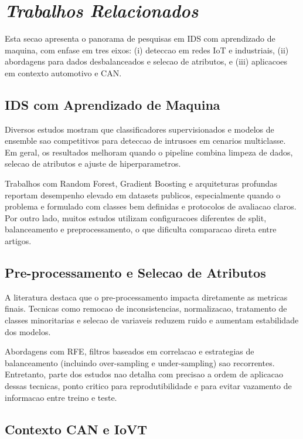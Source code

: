 \chapter{\textit{Trabalhos Relacionados}}

Esta secao apresenta o panorama de pesquisas em IDS com aprendizado de maquina, com enfase em tres eixos: (i) deteccao em redes IoT e industriais, (ii) abordagens para dados desbalanceados e selecao de atributos, e (iii) aplicacoes em contexto automotivo e CAN.

\section{IDS com Aprendizado de Maquina}

Diversos estudos mostram que classificadores supervisionados e modelos de ensemble sao competitivos para deteccao de intrusoes em cenarios multiclasse. Em geral, os resultados melhoram quando o pipeline combina limpeza de dados, selecao de atributos e ajuste de hiperparametros.

Trabalhos com Random Forest, Gradient Boosting e arquiteturas profundas reportam desempenho elevado em datasets publicos, especialmente quando o problema e formulado com classes bem definidas e protocolos de avaliacao claros. Por outro lado, muitos estudos utilizam configuracoes diferentes de split, balanceamento e preprocessamento, o que dificulta comparacao direta entre artigos.

\section{Pre-processamento e Selecao de Atributos}

A literatura destaca que o pre-processamento impacta diretamente as metricas finais. Tecnicas como remocao de inconsistencias, normalizacao, tratamento de classes minoritarias e selecao de variaveis reduzem ruido e aumentam estabilidade dos modelos.

Abordagens com RFE, filtros baseados em correlacao e estrategias de balanceamento (incluindo over-sampling e under-sampling) sao recorrentes. Entretanto, parte dos estudos nao detalha com precisao a ordem de aplicacao dessas tecnicas, ponto critico para reprodutibilidade e para evitar vazamento de informacao entre treino e teste.

\section{Contexto CAN e IoVT}

